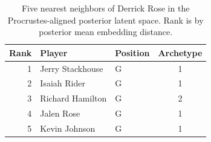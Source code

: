 \begin{table}[htbp]
  \centering\small
  \begin{tabular}{rllc}
    \toprule
    Rank & Player & Position & Archetype \\
    \midrule
    1 & Jerry Stackhouse & G & 1 \\
    2 & Isaiah Rider & G & 1 \\
    3 & Richard Hamilton & G & 2 \\
    4 & Jalen Rose & G & 1 \\
    5 & Kevin Johnson & G & 1 \\
    \bottomrule
  \end{tabular}
  \caption{Five nearest neighbors of Derrick Rose in the Procrustes-aligned posterior latent space. Rank is by posterior mean embedding distance.}
  \label{tab:Derrick_Rose_neighbors}
\end{table}

